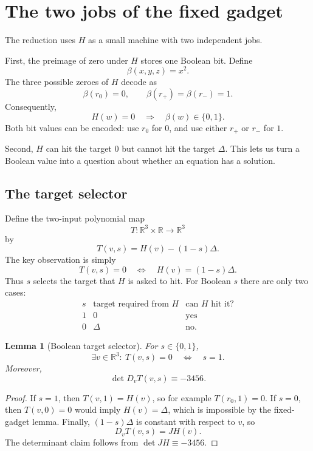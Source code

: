 \documentclass[11pt]{article}
\newtheorem{lemma}[theorem]{Lemma}
\newcommand{\R}{\mathbb{R}}
\begin{document}
\section{The two jobs of the fixed gadget}

The reduction uses $H$ as a small machine with two independent jobs.

First, the preimage of zero under $H$ stores one Boolean bit.  Define
\[
\beta(x,y,z)=x^2.
\]
The three possible zeroes of $H$ decode as
\[
\beta(r_0)=0,
\qquad
\beta(r_+)=\beta(r_-)=1.
\]
Consequently,
\[
H(w)=0
\quad\Longrightarrow\quad
\beta(w)\in\{0,1\}.
\]
Both bit values can be encoded: use $r_0$ for $0$, and use either $r_+$ or
$r_-$ for $1$.

Second, $H$ can hit the target $0$ but cannot hit the target $\Delta$.  This
lets us turn a Boolean value into a question about whether an equation has a
solution.

\subsection{The target selector}

Define the two-input polynomial map
\[
T:\R^3\times\R\longrightarrow\R^3
\]
by
\[
T(v,s)=H(v)-(1-s)\Delta.
\]
The key observation is simply
\[
T(v,s)=0
\quad\Longleftrightarrow\quad
H(v)=(1-s)\Delta.
\]
Thus $s$ selects the target that $H$ is asked to hit.  For Boolean $s$ there
are only two cases:
\[
\begin{array}{c|c|c}
s & \text{target required from }H & \text{can }H\text{ hit it?} \\
\hline
1 & 0      & \text{yes} \\
0 & \Delta & \text{no}.
\end{array}
\]

\begin{lemma}[Boolean target selector]
For $s\in\{0,1\}$,
\[
\exists v\in\R^3:\ T(v,s)=0
\quad\Longleftrightarrow\quad
s=1.
\]
Moreover,
\[
\det D_vT(v,s)\equiv -3456.
\]
\end{lemma}

\begin{proof}
If $s=1$, then $T(v,1)=H(v)$, so for example $T(r_0,1)=0$.  If $s=0$, then
$T(v,0)=0$ would imply $H(v)=\Delta$, which is impossible by the fixed-gadget
lemma.  Finally, $(1-s)\Delta$ is constant with respect to $v$, so
\[
D_vT(v,s)=JH(v).
\]
The determinant claim follows from $\det JH\equiv-3456$.
\end{proof}
\end{document}
